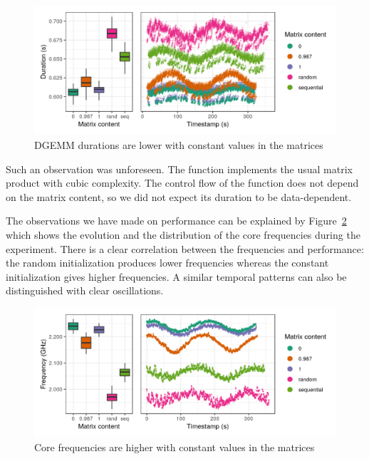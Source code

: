         \begin{figure}[htbp]
            \centering
            \includegraphics[width=\linewidth]{img/experiment/bit-flips/generation_method_perf.png}
            \caption{\label{fig:exp:bit-flips:method-perf}
            DGEMM durations are lower with constant values in the matrices}
        \end{figure}

        Such an observation was unforeseen. The function \dgemm implements the usual matrix product with cubic
        complexity. The control flow of the function does not depend on the matrix content, so we did not expect its
        duration to be data-dependent.

        The observations we have made on \dgemm performance can be explained by
        Figure~\ref{fig:exp:bit-flips:method-freq} which shows the evolution and the distribution of the core
        frequencies during the experiment. There is a clear correlation between the frequencies and \dgemm
        performance: the random initialization produces lower frequencies whereas the constant initialization gives
        higher frequencies. A similar temporal patterns can also be distinguished with clear oscillations.

        \begin{figure}[htbp]
            \centering
            \includegraphics[width=\linewidth]{img/experiment/bit-flips/generation_method_freq.png}
            \caption{\label{fig:exp:bit-flips:method-freq}
            Core frequencies are higher with constant values in the matrices}
        \end{figure}

